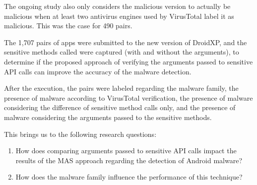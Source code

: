 


The ongoing study also only considers the malicious version to actually be malicious when at least two antivirus engines used by VirusTotal label it as malicious. This was the case for 490 pairs. 

The 1,707 pairs of apps were submitted to the new version of DroidXP, and the sensitive methods called were captured (with and without the arguments), to determine if the proposed approach of verifying the arguments passed to sensitive API calls can improve the accuracy of the malware detection.

After the execution, the pairs were labeled regarding the malware family, the presence of malware according to VirusTotal verification, the presence of malware considering the difference of sensitive method calls only, and the presence of malware considering the arguments passed to the sensitive methods.

This brings us to the following research questions:

\begin{enumerate}
    \item How does comparing arguments passed to sensitive API calls impact the results of the MAS approach regarding the detection of Android malware?
    \item How does the malware family influence the performance of this technique?
\end{enumerate}


